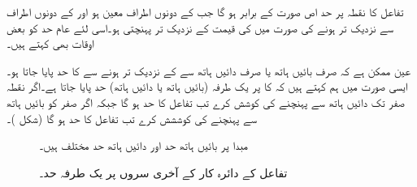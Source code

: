 تفاعل  کا نقطہ  پر حد اص صورت  کے برابر ہو گا جب  کے دونوں اطراف  معین ہو اور  کے دونوں اطراف سے نزدیک تر ہونے کی صورت میں  کی قیمت  کے نزدیک تر پہنچتی ہو۔اسی لئے عام حد کو بعض اوقات  بھی کہتے ہیں۔

عین ممکن ہے کہ صرف بائیں ہاتھ یا صرف دائیں ہاتھ سے   کے نزدیک تر ہونے سے  کا حد پایا جاتا ہو۔ایسی صورت میں ہم کہتے ہیں کہ  کا  پر یک طرفہ (بائیں ہاتھ یا دائیں ہاتھ)  حد پایا جاتا ہے۔اگر  نقطہ صفر تک دائیں ہاتھ سے پہنچنے کی کوشش کرے تب تفاعل  کا حد  ہو گا جبکہ اگر صفر کو  بائیں ہاتھ سے پہنچنے کی کوششش کرے تب تفاعل کا حد  ہو گا (شکل )۔
\begin{figure}
\centering
\begin{minipage}{0.45\textwidth}
\centering
{}
\caption{مبدا پر بائیں ہاتھ حد اور دائیں ہاتھ حد مختلف ہیں۔}
\label{شکل_حد_دایاں_بایاں_مختلف}
\end{minipage}\hfill
\begin{minipage}{0.45\textwidth}
\centering
{}
\caption{تفاعل کے دائرہ کار کے آخری سروں پر یک طرفہ حد۔}
\label{شکل_حد_دایاں_بایاں_مختلف_نصف_دائرہ}
\end{minipage}%
\end{figure}

